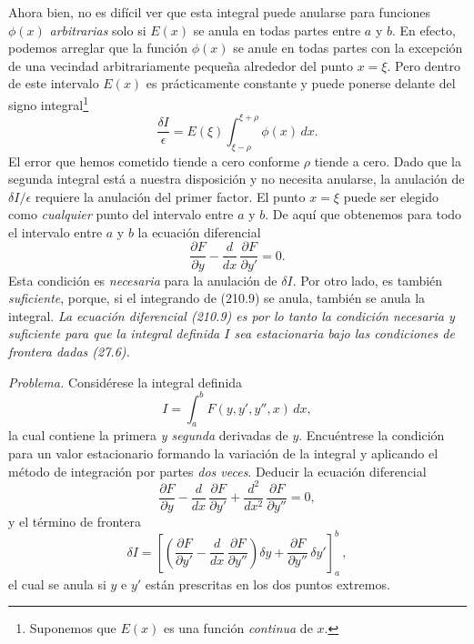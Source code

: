 \documentclass[12pt,a4paper]{book}
\begin{document}
Ahora bien, no es difícil ver que esta integral puede anularse para funciones $\phi(x)$ \textit{arbitrarias} solo si $E(x)$ se anula en todas partes entre $a$ y $b$. En efecto, podemos arreglar que la función $\phi(x)$ se anule en todas partes con la excepción de una vecindad arbitrariamente pequeña alrededor del punto $x = \xi$. Pero dentro de este intervalo $E(x)$ es prácticamente constante y puede ponerse delante del signo integral\footnote{Suponemos que $E(x)$ es una función \textit{continua} de $x$.}
\begin{equation}
\frac{\delta I}{\epsilon} = E(\xi) \int_{\xi - \rho}^{\xi + \rho} \phi(x) \, dx. \tag{210.8}
\end{equation}
El error que hemos cometido tiende a cero conforme $\rho$ tiende a cero. Dado que la segunda integral está a nuestra disposición y no necesita anularse, la anulación de $\delta I / \epsilon$ requiere la anulación del primer factor. El punto $x = \xi$ puede ser elegido como \textit{cualquier} punto del intervalo entre $a$ y $b$. De aquí que obtenemos para todo el intervalo entre $a$ y $b$ la ecuación diferencial
\begin{equation}
\frac{\partial F}{\partial y} - \frac{d}{dx} \, \frac{\partial F}{\partial y'} = 0. \tag{210.9}
\end{equation}
Esta condición es \textit{necesaria} para la anulación de $\delta I$. Por otro lado, es también \textit{suficiente}, porque, si el integrando de (210.9) se anula, también se anula la integral. \textit{La ecuación diferencial (210.9) es por lo tanto la condición necesaria y suficiente para que la integral definida $I$ sea estacionaria bajo las condiciones de frontera dadas (27.6).}

\textit{Problema.} Considérese la integral definida
\begin{equation}
I = \int_a^b F(y, y', y'', x) \, dx, \tag{210.10}
\end{equation}
la cual contiene la primera \textit{y segunda} derivadas de $y$. Encuéntrese la condición para un valor estacionario formando la variación de la integral y aplicando el método de integración por partes \textit{dos veces}. Deducir la ecuación diferencial
\begin{equation}
\frac{\partial F}{\partial y} - \frac{d}{dx} \, \frac{\partial F}{\partial y'} + \frac{d^2}{dx^2} \, \frac{\partial F}{\partial y''} = 0, \tag{210.11}
\end{equation}
y el término de frontera
\begin{equation}
\delta I = \left[ \left( \frac{\partial F}{\partial y'} - \frac{d}{dx} \, \frac{\partial F}{\partial y''} \right) \delta y + \frac{\partial F}{\partial y''} \, \delta y' \right]_a^b \, , \tag{210.12}
\end{equation}
el cual se anula si $y$ e $y'$ están prescritas en los dos puntos extremos.
\end{document}
